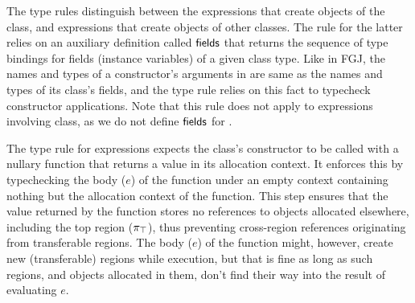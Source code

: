 
The type rules distinguish between the  expressions that create
objects of  the \RgnZ class, and  expressions that create
objects of other classes. The rule for the latter relies on an
auxiliary definition called ${\sf fields}$ that returns the sequence of
type bindings for fields (instance variables) of a given class type.
Like in FGJ, the names and types of a constructor's arguments in \FB
are same as the names and types of its class's fields, and the type
rule relies on this fact to typecheck constructor applications. Note
that this rule does not apply to  expressions involving \RgnZ
class, as we do not define ${\sf fields}$ for \RgnZ. 

The type rule for  expressions expects the \RgnZ class's
constructor to be called with a nullary function that returns a value
in its allocation context. It enforces this by typechecking the body
($e$) of the function under an empty context containing nothing but
the allocation context of the function. This step ensures that the
value returned by the function stores no references to objects
allocated elsewhere, including the top region ($\pi_{\top}$), thus
preventing cross-region references originating from transferable
regions. The body ($e$) of the function might, however, create
new (transferable) regions while execution, but that is fine as long
as such regions, and objects allocated in them, don't find their way
into the result of evaluating $e$.

